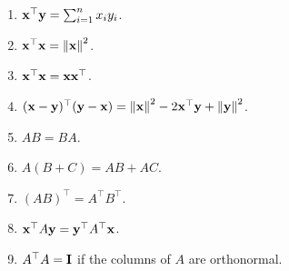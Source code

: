 \documentclass{article}
\begin{document}
\begin{enumerate}
    \item $\mathbf{x}^\top \mathbf{y} = \sum_{i=1}^n x_iy_i$.
    \solution{\newline \textcolor{blue}{True}}
    
    \item $\mathbf{x}^\top \mathbf{x} = \left\|\mathbf{x}\right\|^2$.
    \solution{\newline \textcolor{blue}{True}}
    
    \item $\mathbf{x}^\top \mathbf{x} = \mathbf{x}\mathbf{x}^\top$.
    \solution{\newline \textcolor{blue}{False}}
    
    \item $(\mathbf{x}-\mathbf{y})^\top(\mathbf{y}-\mathbf{x}) = \left\|\mathbf{x}\right\|^2 - 2\mathbf{x}^\top \mathbf{y} + \left\|\mathbf{y}\right\|^2$.
    \solution{\newline \textcolor{blue}{False}}
    
    \item $AB=BA$.
    \solution{\newline \textcolor{blue}{False}}
    
    \item $A(B + C) = AB + AC$.
    \solution{\newline \textcolor{blue}{True}}
    
    \item $(AB)^\top = A^\top B^\top$.
    \solution{\newline \textcolor{blue}{True}}
    
    \item $\mathbf{x}^\top A\mathbf{y} = \mathbf{y}^\top A^\top \mathbf{x}$.
    \solution{\newline \textcolor{blue}{True}}
    
    \item $A^\top A = \mathbf{I}$ if the columns of $A$ are orthonormal.
    \solution{\newline \textcolor{blue}{True}}

\end{enumerate}

\newpage
\end{document}
